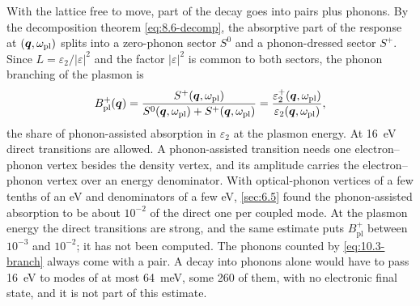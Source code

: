 With the lattice free to move, part of the decay goes into pairs plus phonons. By the decomposition theorem \cref{eq:8.6-decomp}, the absorptive part of the response at $(\bm{q},\omega_{\mathrm{pl}})$ splits into a zero-phonon sector $S^0$ and a phonon-dressed sector $S^+$. Since $L = \varepsilon_2/|\varepsilon|^2$ and the factor $|\varepsilon|^2$ is common to both sectors, the phonon branching of the plasmon is
\begin{equation}
  B_{\mathrm{pl}}^+(\bm{q}) = \frac{S^+(\bm{q},\omega_{\mathrm{pl}})}{S^0(\bm{q},\omega_{\mathrm{pl}}) + S^+(\bm{q},\omega_{\mathrm{pl}})} = \frac{\varepsilon_2^+(\bm{q},\omega_{\mathrm{pl}})}{\varepsilon_2(\bm{q},\omega_{\mathrm{pl}})} ,
  \label{eq:10.3-branch}
\end{equation}
the share of phonon-assisted absorption in $\varepsilon_2$ at the plasmon energy. At \SI{16}{eV} direct transitions are allowed. A phonon-assisted transition needs one electron--phonon vertex besides the density vertex, and its amplitude carries the electron--phonon vertex over an energy denominator. With optical-phonon vertices of a few tenths of an eV and denominators of a few eV, \cref{sec:6.5} found the phonon-assisted absorption to be about $10^{-2}$ of the direct one per coupled mode. At the plasmon energy the direct transitions are strong, and the same estimate puts $B_{\mathrm{pl}}^+$ between $10^{-3}$ and $10^{-2}$; it has not been computed. The phonons counted by \cref{eq:10.3-branch} always come with a pair. A decay into phonons alone would have to pass \SI{16}{eV} to modes of at most \SI{64}{meV}, some 260 of them, with no electronic final state, and it is not part of this estimate.
